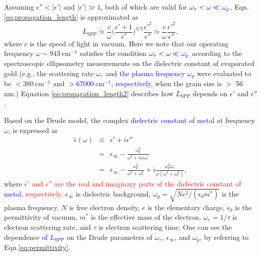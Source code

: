 \documentclass[aip,apl,reprint]{revtex4-1}
\begin{document}
\color{red}
Assuming $\epsilon'' < |\epsilon'|$ and $|\epsilon'| \gg 1$, both of which are valid for $\omega_{\mathrm{\tau}} < \omega \textcolor{blue}{\: \ll \omega_p}$, Eqn.\ref{eq:propagation_length} is approximated as\cite{Raether}
\begin{equation}
L_{\mathrm{SPP}} \simeq \frac{c}{\omega} \biggl(\frac{\epsilon'+1}{\epsilon'}\biggr)^{3/2} \frac{\epsilon'^2}{\epsilon''} \simeq \frac{c}{\omega} \frac{\epsilon'^2}{\epsilon''},
\label{eq:propagation_length2}
\end{equation}
where $c$ is the speed of light in vacuum. Here we note that our operating frequency $\omega \sim 943 ~\mathrm{cm}^{-1}$ satisfies the condition $\omega_{\mathrm{\tau}} < \omega \textcolor{blue}{\: \ll \omega_p}$ according to the spectroscopic ellipsometry measurements on the dielectric constant of evaporated gold \cite{Olmon, Trollmann}  (e.g., the scattering rate $\omega_{\mathrm{\tau}}$ and \textcolor{blue}{the plasma frequency $\omega_p$} were evaluated to be $< 380\:\mathrm{cm}^{-1}$ and \textcolor{blue}{$> 67000\:\mathrm{cm}^{-1}$}, \textcolor{blue}{respectively}, when the grain size is $>$ 56 nm.\cite{Trollmann}) Equation \ref{eq:propagation_length2} describes how $L_{\mathrm{SPP}}$ depends on $\epsilon'$ and $\epsilon''$. 

\color{red}
Based on the Drude model, the complex \textcolor{blue}{dielectric constant} of \textcolor{blue}{metal} at frequency $\omega$, is expressed as
\begin{eqnarray}
\tilde{\epsilon}(\omega) &\equiv& \epsilon' + i \epsilon'' \nonumber \\
&=& \epsilon_{\infty} - \frac{\omega_p^2}{\omega^2+i\omega \omega_{\mathrm{\tau}}} \nonumber \\
&=& \epsilon_{\infty} - \frac{\omega_p^2}{\omega^2+ \omega_{\mathrm{\tau}}^2} + i \frac{\omega_p^2 \omega_{\mathrm{\tau}}}{\omega (\omega^2 + \omega_{\mathrm{\tau}}^2)},
\label{eq:permittivity}
\end{eqnarray}
where \textcolor{red}{$\epsilon'$ and $\epsilon''$ are the real and imaginary parts of the dielectric constant of \textcolor{blue}{metal}, respectively,} $\epsilon_{\infty}$ is dielectric background,  $\omega_p=\sqrt{Ne^2/ (\epsilon_0 m^*)}$ is the plasma frequency, $N$ is free electron density, $e$ is the elementary charge, $\epsilon_0$ is the permittivity of vacuum, $m^*$ is the effective mass of the electron, $\omega_{\mathrm{\tau}}=1/\tau$ is electron scattering rate, and $\tau$ is electron scattering time. One can see the dependence \textcolor{blue}{of $L_{\mathrm{SPP}}$} on the Drude parameters of $\omega_{\mathrm{\tau}}$, $\epsilon_{\infty}$, and $\omega_p$, by referring to Eqn.\ref{eq:permittivity}.
\end{document}

